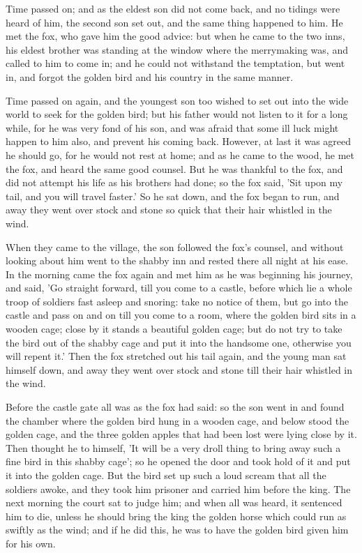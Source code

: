 \documentclass[12pt]{book}
\begin{document}
Time passed on; and as the eldest son did not come back, and no
tidings were heard of him, the second son set out, and the same thing
happened to him. He met the fox, who gave him the good advice: but
when he came to the two inns, his eldest brother was standing at the
window where the merrymaking was, and called to him to come in; and he
could not withstand the temptation, but went in, and forgot the golden
bird and his country in the same manner.

Time passed on again, and the youngest son too wished to set out into
the wide world to seek for the golden bird; but his father would not
listen to it for a long while, for he was very fond of his son, and
was afraid that some ill luck might happen to him also, and prevent
his coming back. However, at last it was agreed he should go, for he
would not rest at home; and as he came to the wood, he met the fox,
and heard the same good counsel. But he was thankful to the fox, and
did not attempt his life as his brothers had done; so the fox said,
'Sit upon my tail, and you will travel faster.' So he sat down, and
the fox began to run, and away they went over stock and stone so quick
that their hair whistled in the wind.

When they came to the village, the son followed the fox's counsel, and
without looking about him went to the shabby inn and rested there all
night at his ease. In the morning came the fox again and met him as he
was beginning his journey, and said, 'Go straight forward, till you
come to a castle, before which lie a whole troop of soldiers fast
asleep and snoring: take no notice of them, but go into the castle and
pass on and on till you come to a room, where the golden bird sits in
a wooden cage; close by it stands a beautiful golden cage; but do not
try to take the bird out of the shabby cage and put it into the
handsome one, otherwise you will repent it.' Then the fox stretched
out his tail again, and the young man sat himself down, and away they
went over stock and stone till their hair whistled in the wind.

Before the castle gate all was as the fox had said: so the son went in
and found the chamber where the golden bird hung in a wooden cage, and
below stood the golden cage, and the three golden apples that had been
lost were lying close by it. Then thought he to himself, 'It will be a
very droll thing to bring away such a fine bird in this shabby cage';
so he opened the door and took hold of it and put it into the golden
cage. But the bird set up such a loud scream that all the soldiers
awoke, and they took him prisoner and carried him before the king. The
next morning the court sat to judge him; and when all was heard, it
sentenced him to die, unless he should bring the king the golden horse
which could run as swiftly as the wind; and if he did this, he was to
have the golden bird given him for his own.
\end{document}
